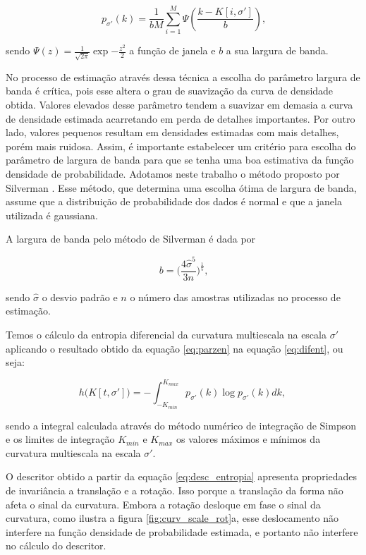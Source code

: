 \begin{equation}\label{eq:parzen}
p_{\sigma'}(k) = \frac{1}{bM}\sum\limits_{i=1}^M\Psi(\frac{k - K[i,\sigma']}{b})\text{,}
\end{equation}

sendo $\Psi(z) = \frac{1}{\sqrt{2\pi}}\exp{-\frac{z^2}{2}}$ a função de janela e $b$ a sua largura de banda.

No processo de estimação através dessa técnica a escolha do parâmetro largura de banda é crítica, pois esse altera o grau de suavização da curva de densidade obtida. Valores elevados desse parâmetro tendem a suavizar em demasia a curva de densidade estimada acarretando em perda de detalhes importantes. Por outro lado, valores pequenos resultam em densidades estimadas com mais detalhes, porém mais ruidosa. Assim, é importante estabelecer um critério para escolha do parâmetro de largura de banda para que se tenha uma boa estimativa da função densidade de probabilidade. Adotamos neste trabalho o método proposto por Silverman \cite{silverman:1986}. Esse método, que determina uma escolha ótima de largura de banda, assume que a distribuição de probabilidade dos dados é normal e que a janela utilizada é gaussiana.

A largura de banda pelo método de Silverman é dada por \cite{silverman:1986}

\begin{equation}
b = \big(\frac{4\hat{\sigma}^5}{3n}\big)^\frac{1}{5}\text{,}
\end{equation}

sendo $\hat{\sigma}$ o desvio padrão e $n$ o número das amostras utilizadas no processo de estimação. 

Temos o cálculo da entropia diferencial da curvatura multiescala na escala $\sigma'$ aplicando o resultado obtido da equação \ref{eq:parzen} na equação \ref{eq:difent}, ou seja:

\begin{equation}\label{eq:desc_entropia}
h\big(K[t,\sigma']\big) = -\int_{-K_{min}}^{K_{max}}p_{\sigma'}(k)\log{p_{\sigma'}(k)}dk\text{, }
\end{equation}

sendo a integral calculada através do método numérico de integração de Simpson e os limites de integração $K_{min}$ e $K_{max}$ os valores máximos e mínimos da curvatura multiescala na escala $\sigma'$.

O descritor obtido a partir da equação \ref{eq:desc_entropia} apresenta propriedades de invariância a translação e a rotação. Isso porque a translação da forma não afeta o sinal da curvatura. Embora a rotação desloque em fase o sinal da curvatura, como ilustra a figura \ref{fig:curv_scale_rot}a, esse deslocamento não interfere na função densidade de probabilidade estimada, e portanto não interfere no cálculo do descritor.

